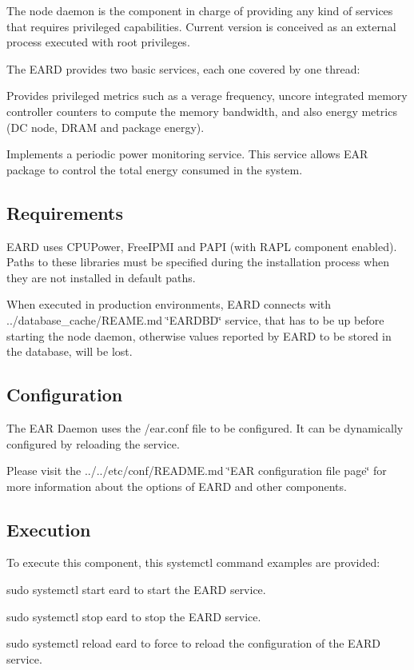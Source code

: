 The node daemon is the component in charge of providing any kind of services that requires privileged capabilities. Current version is conceived as an external process executed with root privileges.

The E\+A\+RD provides two basic services, each one covered by one thread\+:
\begin{DoxyItemize}
\item Provides privileged metrics such as a verage frequency, uncore integrated memory controller counters to compute the memory bandwidth, and also energy metrics (DC node, D\+R\+AM and package energy).
\item Implements a periodic power monitoring service. This service allows E\+AR package to control the total energy consumed in the system.
\end{DoxyItemize}

\subsection*{Requirements }

E\+A\+RD uses C\+P\+U\+Power, Free\+I\+P\+MI and P\+A\+PI (with R\+A\+PL component enabled). Paths to these libraries must be specified during the installation process when they are not installed in default paths.

When executed in production environments, E\+A\+RD connects with ../database\+\_\+cache/\+R\+E\+A\+ME.md \char`\"{}\+E\+A\+R\+D\+B\+D\char`\"{} service, that has to be up before starting the node daemon, otherwise values reported by E\+A\+RD to be stored in the database, will be lost.

\subsection*{Configuration }

The E\+AR Daemon uses the {\ttfamily /ear.conf} file to be configured. It can be dynamically configured by reloading the service.

Please visit the ../../etc/conf/\+R\+E\+A\+D\+ME.md \char`\"{}\+E\+A\+R configuration file page\char`\"{} for more information about the options of E\+A\+RD and other components.

\subsection*{Execution }

To execute this component, this {\ttfamily systemctl} command examples are provided\+:
\begin{DoxyItemize}
\item {\ttfamily sudo systemctl start eard} to start the E\+A\+RD service.
\item {\ttfamily sudo systemctl stop eard} to stop the E\+A\+RD service.
\item {\ttfamily sudo systemctl reload eard} to force to reload the configuration of the E\+A\+RD service.
\end{DoxyItemize}

